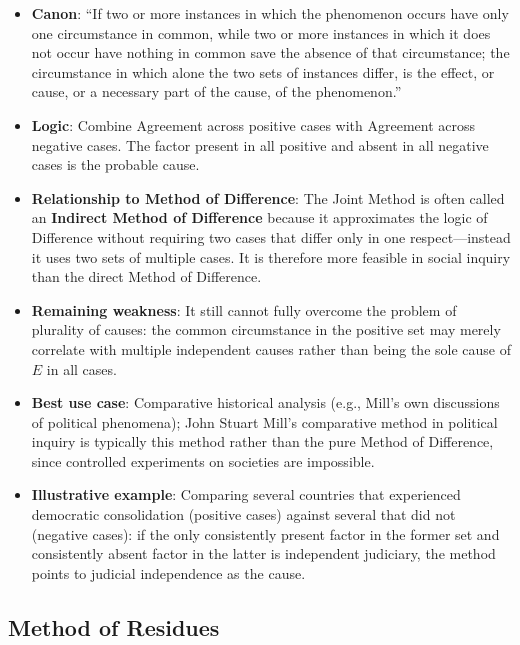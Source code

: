 \documentclass[12pt]{article}
\begin{document}
\begin{itemize}[leftmargin=*, itemsep=4pt]
    \item \textbf{Canon}: ``If two or more instances in which the phenomenon occurs have only one circumstance in common, while two or more instances in which it does not occur have nothing in common save the absence of that circumstance; the circumstance in which alone the two sets of instances differ, is the effect, or cause, or a necessary part of the cause, of the phenomenon.''
    \item \textbf{Logic}: Combine Agreement across positive cases with Agreement across negative cases. The factor present in all positive and absent in all negative cases is the probable cause.
    \item \textbf{Relationship to Method of Difference}: The Joint Method is often called an \textbf{Indirect Method of Difference} because it approximates the logic of Difference without requiring two cases that differ only in one respect---instead it uses two sets of multiple cases. It is therefore more feasible in social inquiry than the direct Method of Difference.
    \item \textbf{Remaining weakness}: It still cannot fully overcome the problem of plurality of causes: the common circumstance in the positive set may merely correlate with multiple independent causes rather than being the sole cause of $E$ in all cases.
    \item \textbf{Best use case}: Comparative historical analysis (e.g., Mill's own discussions of political phenomena); John Stuart Mill's comparative method in political inquiry is typically this method rather than the pure Method of Difference, since controlled experiments on societies are impossible.
    \item \textbf{Illustrative example}: Comparing several countries that experienced democratic consolidation (positive cases) against several that did not (negative cases): if the only consistently present factor in the former set and consistently absent factor in the latter is independent judiciary, the method points to judicial independence as the cause.
\end{itemize}

\subsection{Method of Residues}
\end{document}
